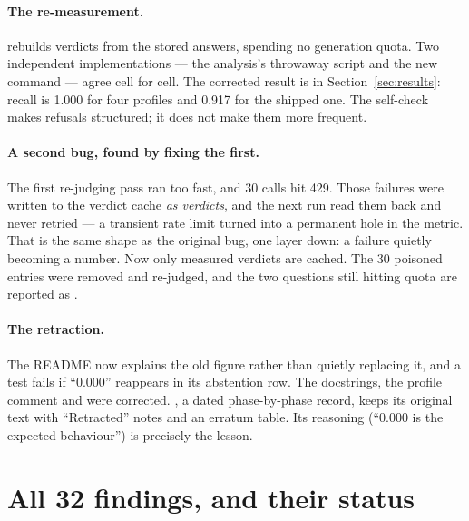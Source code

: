 \paragraph{The re-measurement.}  rebuilds verdicts from the stored answers, spending no generation quota. Two independent implementations --- the analysis's throwaway script and the new command --- agree cell for cell. The corrected result is in Section~\ref{sec:results}: recall is 1.000 for four profiles and 0.917 for the shipped one. The self-check makes refusals structured; it does not make them more frequent.

\paragraph{A second bug, found by fixing the first.} The first re-judging pass ran too fast, and 30 calls hit 429. Those failures were written to the verdict cache \emph{as verdicts}, and the next run read them back and never retried --- a transient rate limit turned into a permanent hole in the metric. That is the same shape as the original bug, one layer down: a failure quietly becoming a number. Now only measured verdicts are cached. The 30 poisoned entries were removed and re-judged, and the two  questions still hitting quota are reported as .

\paragraph{The retraction.} The README now explains the old figure rather than quietly replacing it, and a test fails if ``0.000'' reappears in its abstention row. The docstrings, the profile comment and  were corrected. , a dated phase-by-phase record, keeps its original text with ``Retracted'' notes and an erratum table. Its reasoning (``0.000 is the expected behaviour'') is precisely the lesson.

\section{All 32 findings, and their status}
\label{sec:findings}

